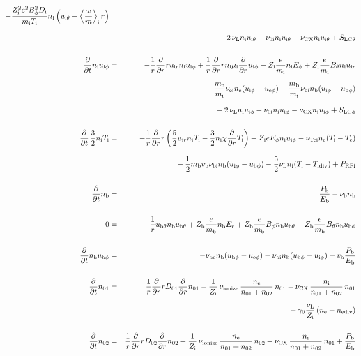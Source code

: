 \documentclass[11pt]{article}
\def\r#1{{\rm#1}}
\def\ddt{\frac{\partial}{\partial t}}
\def\ddr{\frac{\partial}{\partial r}}
\def\ave#1{\left\langle#1\right\rangle}
\def\me{m_\r{e}}
\def\mi{m_\r{i}}
\def\mb{m_\r{b}}
\def\mue{\mu_\r{e}}
\def\mui{\mu_\r{i}}
\def\De{D_\r{e}}
\def\Di{D_\r{i}}
\def\ne{n_\r{e}}
\def\ni{n_\r{i}}
\def\nb{n_\r{b}}
\def\uir{u_{\r{i}r}}
\def\uith{u_{\r{i}\theta}}
\def\ubth{u_{\r{b}\theta}}
\def\ueph{u_{\r{e}\phi}}
\def\uiph{u_{\r{i}\phi}}
\def\ubph{u_{\r{b}\phi}}
\def\Er{E_r}
\def\Eph{E_\phi}
\def\Bth{B_\theta}
\def\Bph{B_\phi}
\def\Te{T_\r{e}}
\def\Ti{T_\r{i}}
\def\nna{n_{01}}
\def\nnb{n_{02}}
\def\Zi{Z_\r{i}}
\def\Zb{Z_\r{b}}
\def\Pb{P_\r{b}}
\def\Eb{E_\r{b}}
\def\PRFi{P_\r{RFi}}
\def\nuei{\nu_\r{ei}}
\def\nube{\nu_\r{be}}
\def\nubi{\nu_\r{bi}}
\def\nuni{\nu_\r{0i}}
\def\nuL{\nu_\r{L}}
\def\nuCX{\nu_\r{CX}}
\def\nuion{\nu_\r{ionize}}
\def\nub{\nu_\r{b}}
\def\nuTei{\nu_\r{Tei}}
\def\vb{v_\r{b}}
\def\nediv{n_\r{ediv}}
\def\Tidiv{T_\r{idiv}}
\newcommand{\Frac}[2]{%
  {\displaystyle {\displaystyle #1\over \displaystyle #2}}%
}
\newcommand{\rdprd}[2]{\Frac{\partial #1}{\partial #2}}
\newcommand{\aveaveB}[1]{\left< \!\! \left< #1 \right> \!\! \right>}
\begin{document}
\begin{eqnarray}
%
  - \frac{\Zi^2 e^2 \Bph^2 \Di}{\mi\Ti}\ni
    \left(\uith - \ave{\frac{\omega}{m}}_\r{i} r \right)
%
\nonumber\\[2.5mm]&&{}
%
  - 2\, \nuL \ni \uith
%
  - \nuni \ni \uith
%
  - \nuCX \ni \uith
%
  + S_\r{LC\theta}
\\[5mm]
%
%
  \ddt \ni \uiph &=&
%
  - \frac{1}{r} \ddr r \uir \ni \uiph
%
  + \frac{1}{r} \ddr r \ni \mui \ddr \uiph
%
  + \Zi \frac{e}{\mi} \ni \Eph
%
  + \Zi \frac{e}{\mi} \Bth \ni \uir 
\nonumber\\[2.5mm]&&{}
%
  - \frac{\me}{\mi} \nuei \ne (\uiph - \ueph)
%
  - \frac{\mb}{\mi} \nubi \nb (\uiph - \ubph)
\nonumber\\[2.5mm]&&{}
%
  - 2\, \nuL \ni \uiph
%
  - \nuni \ni \uiph
%
  - \nuCX \ni \uiph
%
  + S_\r{LC\phi}
\\[5mm]
%
%
  \ddt \, \frac{3}{2} \ni \Ti &=&
%
 - \frac{1}{r} \ddr r
   \left( \frac{5}{2} \uir \ni \Ti - \frac{3}{2} \ni \chi \ddr \Ti \right)
%
  + \Zi e \Eph \ni \uiph
%
  - \nuTei \ne (\Ti - \Te)
\nonumber\\[2.5mm]&&{}
%
  - \frac{1}{2} \mb \vb \nubi \nb (\uiph - \ubph)
%
  - \frac{5}{2} \nuL \ni (\Ti - \Tidiv)
%
  + \PRFi
\\[5mm]
%
%
  \ddt \nb &=&
%
    \frac{\Pb}{\Eb}
%
  - \nub \nb
\\[5mm]
%
%
  0 &=&
%
    \frac{1}{r} \ubth \nb \ubth
%
  + \Zb \frac{e}{\mb} \nb \Er 
%
  + \Zb \frac{e}{\mb} \Bph \nb \ubth
%
  - \Zb \frac{e}{\mb} \Bth \nb \ubph
\\[5mm]
%
%
  \ddt \nb \ubph &=&
%
  - \nube \nb (\ubph - \ueph)
%
  - \nubi \nb (\ubph - \uiph)
%
  + \vb \frac{\Pb}{\Eb}
\\[5mm]
%
%
  \ddt \nna &=& 
%
    \frac{1}{r} \ddr r D_{01} \ddr \nna
%
  - \frac{1}{\Zi}\, \nuion\, \frac{\ne}{\nna+\nnb}\, \nna
%
  - \nuCX\, \frac{\ni}{\nna+\nnb}\, \nna
\nonumber\\[2.5mm]&&{}
%
  + \gamma_0 \frac{\nuL}{\Zi} \, (\ne - \nediv)
\\[5mm]
%
%
  \ddt \nnb &=& 
%
    \frac{1}{r} \ddr r D_{02} \ddr \nnb
%
  - \frac{1}{\Zi}\, \nuion\, \frac{\ne}{\nna+\nnb}\, \nnb
%
  + \nuCX\, \frac{\ni}{\nna+\nnb}\, \nna
%
  + \frac{\Pb}{\Eb}
\end{eqnarray}
\end{document}
